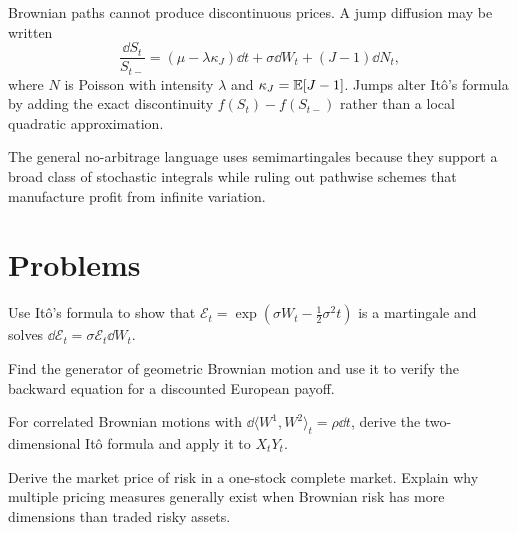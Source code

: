 Brownian paths cannot produce discontinuous prices. A jump diffusion may be written
\[
\frac{\dd S_t}{S_{t-}}
=(\mu-\lambda\kappa_J)\dd t+\sigma\dd W_t+(J-1)\dd N_t,
\]
where $N$ is Poisson with intensity $\lambda$ and
$\kappa_J=\operatorname{\mathbb E}[J-1]$. Jumps alter Itô's formula by adding the exact discontinuity
$f(S_t)-f(S_{t-})$ rather than a local quadratic approximation.

The general no-arbitrage language uses semimartingales because they support a broad
class of stochastic integrals while ruling out pathwise schemes that manufacture
profit from infinite variation.

\section{Problems}

\begin{exercise}
Use Itô's formula to show that
$\mathcal E_t=\exp(\sigma W_t-\frac12\sigma^2t)$ is a martingale and solves
$\dd\mathcal E_t=\sigma\mathcal E_t\dd W_t$.
\end{exercise}
\begin{exercise}
Find the generator of geometric Brownian motion and use it to verify the backward
equation for a discounted European payoff.
\end{exercise}
\begin{exercise}
For correlated Brownian motions with $\dd\langle W^1,W^2\rangle_t=\rho\dd t$, derive
the two-dimensional Itô formula and apply it to $X_tY_t$.
\end{exercise}
\begin{exercise}
Derive the market price of risk in a one-stock complete market. Explain why multiple
pricing measures generally exist when Brownian risk has more dimensions than traded
risky assets.
\end{exercise}
